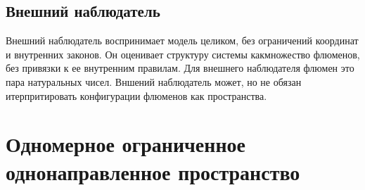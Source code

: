 \documentclass[final]{article}
\begin{document}
        \subsection{Внешний наблюдатель}

        Внешний наблюдатель воспринимает модель целиком, без ограничений 
        координат и внутренних законов. Он оценивает структуру системы 
        какмножество флюменов, без привязки к ее внутренним правилам. Для 
        внешнего наблюдателя флюмен это пара натуральных чисел. Вншений 
        наблюдатель может, но не обязан итерпритировать конфигурации флюменов 
        как пространства.

    \section{Одномерное ограниченное однонаправленное пространство}
\end{document}
